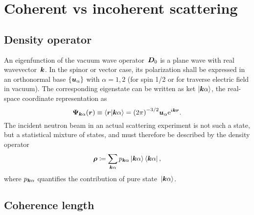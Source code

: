 \section{Coherent vs incoherent scattering}\label{Scoherlen}

\subsection{Density operator}\label{SdensityMatrix}

An eigenfunction of the vacuum wave operator~$\bm{D}_0$ is a plane wave
with real wavevector~${\bm{k}}$.
%
In the spinor or vector case, its polarization shall be expressed
in an orthonormal base $\{\bm{u}_\alpha\}$
with $\alpha=1,2$
(for spin 1/2 or for traverse electric field in vacuum).
The corresponding eigenstate can be written as ket $\ket{{{\bm{k}}\alpha}}$,
the real-space coordinate representation as
\begin{equation}\label{EvacWave}
   \v\Psi_\ka(\r)
   \equiv \braket{\r|\ka}
   = {(2\pi)}^{-3/2} \v{u}_\alpha \e^{i\k\r}.
\end{equation}
The incident neutron beam in an actual scattering experiment
is not such a  state,
%
%
but a statistical mixture of states,
%
and must therefore be described by the density operator
%
%
\begin{equation}\label{EdefRho}
  \v\rho \coloneqq \sum_\ka p_\ka \ket\ka\bra\ka,
\end{equation}
where $p_{{\bm{k}}\alpha}$ quantifies the contribution of pure state~$\ket{{{\bm{k}}\alpha}}$.
%

\subsection{Coherence length}

